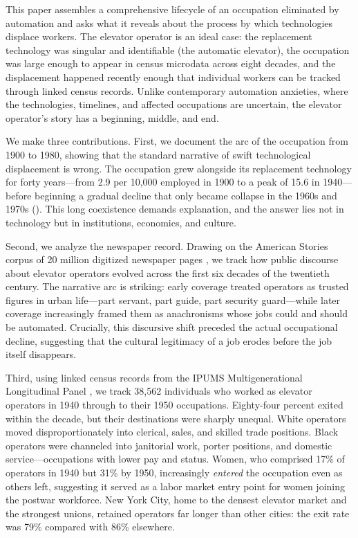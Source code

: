 \documentclass[12pt]{article}
\begin{document}
This paper assembles a comprehensive lifecycle of an occupation eliminated by automation and asks what it reveals about the process by which technologies displace workers. The elevator operator is an ideal case: the replacement technology was singular and identifiable (the automatic elevator), the occupation was large enough to appear in census microdata across eight decades, and the displacement happened recently enough that individual workers can be tracked through linked census records. Unlike contemporary automation anxieties, where the technologies, timelines, and affected occupations are uncertain, the elevator operator's story has a beginning, middle, and end.

We make three contributions. First, we document the arc of the occupation from 1900 to 1980, showing that the standard narrative of swift technological displacement is wrong. The occupation grew alongside its replacement technology for forty years---from 2.9 per 10,000 employed in 1900 to a peak of 15.6 in 1940---before beginning a gradual decline that only became collapse in the 1960s and 1970s (). This long coexistence demands explanation, and the answer lies not in technology but in institutions, economics, and culture.

Second, we analyze the newspaper record. Drawing on the American Stories corpus of 20 million digitized newspaper pages \citep{dell2023}, we track how public discourse about elevator operators evolved across the first six decades of the twentieth century. The narrative arc is striking: early coverage treated operators as trusted figures in urban life---part servant, part guide, part security guard---while later coverage increasingly framed them as anachronisms whose jobs could and should be automated. Crucially, this discursive shift preceded the actual occupational decline, suggesting that the cultural legitimacy of a job erodes before the job itself disappears.

Third, using linked census records from the IPUMS Multigenerational Longitudinal Panel \citep{ruggles2024}, we track 38,562 individuals who worked as elevator operators in 1940 through to their 1950 occupations. Eighty-four percent exited within the decade, but their destinations were sharply unequal. White operators moved disproportionately into clerical, sales, and skilled trade positions. Black operators were channeled into janitorial work, porter positions, and domestic service---occupations with lower pay and status. Women, who comprised 17\% of operators in 1940 but 31\% by 1950, increasingly \emph{entered} the occupation even as others left, suggesting it served as a labor market entry point for women joining the postwar workforce. New York City, home to the densest elevator market and the strongest unions, retained operators far longer than other cities: the exit rate was 79\% compared with 86\% elsewhere.
\end{document}
